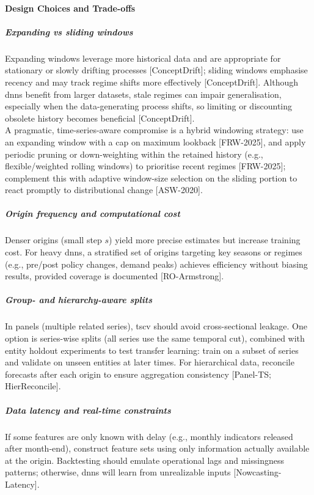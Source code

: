 \paragraph{Design Choices and Trade-offs}
\subparagraph{
Expanding vs sliding windows}

Expanding windows leverage more historical data and are appropriate for stationary or slowly drifting processes [ConceptDrift]; sliding windows emphasise recency and may track regime shifts more effectively [ConceptDrift]. Although \acrshort{dnns} benefit from larger datasets, stale regimes can impair generalisation, especially when the data-generating process shifts, so limiting or discounting obsolete history becomes beneficial [ConceptDrift]. \\

A pragmatic, time-series-aware compromise is a hybrid windowing strategy: use an expanding window with a cap on maximum lookback [FRW-2025], and apply periodic pruning or down-weighting within the retained history (e.g., flexible/weighted rolling windows) to prioritise recent regimes [FRW-2025]; complement this with adaptive window-size selection on the sliding portion to react promptly to distributional change [ASW-2020].

\subparagraph{Origin frequency and computational cost}

Denser origins (small step $s$) yield more precise estimates but increase training cost. For heavy \acrshort{dnns}, a stratified set of origins targeting key seasons or regimes (e.g., pre/post policy changes, demand peaks) achieves efficiency without biasing results, provided coverage is documented [RO-Armstrong].

\subparagraph{Group- and hierarchy-aware splits} In panels (multiple related series), \acrshort{tscv} should avoid cross-sectional leakage. One option is series-wise splits (all series use the same temporal cut), combined with entity holdout experiments to test transfer learning: train on a subset of series and validate on unseen entities at later times. For hierarchical data, reconcile forecasts after each origin to ensure aggregation consistency [Panel-TS; HierReconcile].

\subparagraph{Data latency and real-time constraints} If some features are only known with delay (e.g., monthly indicators released after month-end), construct feature sets using only information actually available at the origin. Backtesting should emulate operational lags and missingness patterns; otherwise, \acrshort{dnn}s will learn from unrealizable inputs [Nowcasting-Latency].

